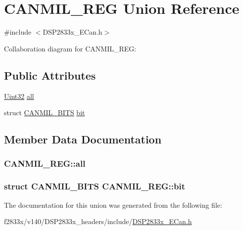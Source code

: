 \hypertarget{union_c_a_n_m_i_l___r_e_g}{}\section{C\+A\+N\+M\+I\+L\+\_\+\+R\+E\+G Union Reference}
\label{union_c_a_n_m_i_l___r_e_g}


{\ttfamily \#include $<$D\+S\+P2833x\+\_\+\+E\+Can.\+h$>$}



Collaboration diagram for C\+A\+N\+M\+I\+L\+\_\+\+R\+E\+G\+:
\subsection*{Public Attributes}
\begin{DoxyCompactItemize}
\item 
\hyperlink{_d_s_p2833x___device_8h_aba99025e657f892beb7ff31cecf64653}{Uint32} \hyperlink{union_c_a_n_m_i_l___r_e_g_a83f6296c15f8b88cadf23af60f91670d}{all}
\item 
struct \hyperlink{struct_c_a_n_m_i_l___b_i_t_s}{C\+A\+N\+M\+I\+L\+\_\+\+B\+I\+T\+S} \hyperlink{union_c_a_n_m_i_l___r_e_g_a5d07b95b8f1b5ec65e6d64e0f8817eec}{bit}
\end{DoxyCompactItemize}


\subsection{Member Data Documentation}
\hypertarget{union_c_a_n_m_i_l___r_e_g_a83f6296c15f8b88cadf23af60f91670d}{}
\subsubsection[{all}]{ C\+A\+N\+M\+I\+L\+\_\+\+R\+E\+G\+::all}\label{union_c_a_n_m_i_l___r_e_g_a83f6296c15f8b88cadf23af60f91670d}
\hypertarget{union_c_a_n_m_i_l___r_e_g_a5d07b95b8f1b5ec65e6d64e0f8817eec}{}
\subsubsection[{bit}]{\setlength{\rightskip}{0pt plus 5cm}struct {\bf C\+A\+N\+M\+I\+L\+\_\+\+B\+I\+T\+S} C\+A\+N\+M\+I\+L\+\_\+\+R\+E\+G\+::bit}\label{union_c_a_n_m_i_l___r_e_g_a5d07b95b8f1b5ec65e6d64e0f8817eec}


The documentation for this union was generated from the following file\+:\begin{DoxyCompactItemize}
\item 
f2833x/v140/\+D\+S\+P2833x\+\_\+headers/include/\hyperlink{_d_s_p2833x___e_can_8h}{D\+S\+P2833x\+\_\+\+E\+Can.\+h}\end{DoxyCompactItemize}
